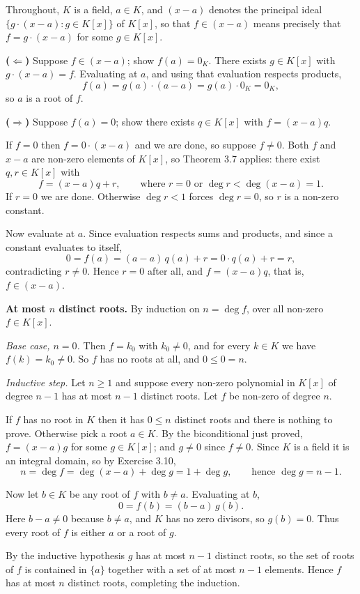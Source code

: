\documentclass[11pt]{article}
\begin{document}
\begin{solution}
  Throughout, $K$ is a field, $a \in K$, and $(x-a)$ denotes the principal ideal
  $\{g \cdot (x-a) : g \in K[x]\}$ of $K[x]$, so that $f \in (x-a)$ means
  precisely that $f = g \cdot (x-a)$ for some $g \in K[x]$.

  \medskip
  \textbf{($\Leftarrow$)} Suppose $f \in (x-a)$; show $f(a) = 0_{K}$. There
  exists $g \in K[x]$ with $g \cdot (x-a) = f$. Evaluating at $a$, and using
  that evaluation respects products,
  \[
    f(a) = g(a) \cdot (a - a) = g(a) \cdot 0_{K} = 0_{K},
  \]
  so $a$ is a root of $f$.

  \medskip
  \textbf{($\Rightarrow$)} Suppose $f(a) = 0$; show there exists $q \in K[x]$
  with $f = (x-a)q$.

  If $f = 0$ then $f = 0 \cdot (x-a)$ and we are done, so suppose $f \neq 0$.
  Both $f$ and $x-a$ are non-zero elements of $K[x]$, so Theorem 3.7 applies:
  there exist $q, r \in K[x]$ with
  \[
    f = (x-a)q + r, \qquad \text{where } r = 0 \text{ or }
    \deg r < \deg (x-a) = 1 .
  \]
  If $r = 0$ we are done. Otherwise $\deg r < 1$ forces $\deg r = 0$, so $r$ is
  a non-zero constant.

  Now evaluate at $a$. Since evaluation respects sums and products, and since a
  constant evaluates to itself,
  \[
    0 = f(a) = (a-a)\,q(a) + r = 0 \cdot q(a) + r = r ,
  \]
  contradicting $r \neq 0$. Hence $r = 0$ after all, and $f = (x-a)q$, that is,
  $f \in (x-a)$.

  \medskip
  \textbf{At most $n$ distinct roots.} By induction on $n = \deg f$, over all
  non-zero $f \in K[x]$.

  \emph{Base case, $n = 0$.} Then $f = k_{0}$ with $k_{0} \neq 0$, and for every
  $k \in K$ we have $f(k) = k_{0} \neq 0$. So $f$ has no roots at all, and
  $0 \leq 0 = n$.

  \emph{Inductive step.} Let $n \geq 1$ and suppose every non-zero polynomial in
  $K[x]$ of degree $n-1$ has at most $n-1$ distinct roots. Let $f$ be non-zero
  of degree $n$.

  If $f$ has no root in $K$ then it has $0 \leq n$ distinct roots and there is
  nothing to prove. Otherwise pick a root $a \in K$. By the biconditional just
  proved, $f = (x-a)g$ for some $g \in K[x]$; and $g \neq 0$ since $f \neq 0$.
  Since $K$ is a field it is an integral domain, so by Exercise 3.10,
  \[
    n = \deg f = \deg (x-a) + \deg g = 1 + \deg g, \qquad
    \text{hence } \deg g = n-1 .
  \]

  Now let $b \in K$ be any root of $f$ with $b \neq a$. Evaluating at $b$,
  \[
    0 = f(b) = (b-a)\,g(b) .
  \]
  Here $b - a \neq 0$ because $b \neq a$, and $K$ has no zero divisors, so
  $g(b) = 0$. Thus every root of $f$ is either $a$ or a root of $g$.

  By the inductive hypothesis $g$ has at most $n-1$ distinct roots, so the set
  of roots of $f$ is contained in $\{a\}$ together with a set of at most $n-1$
  elements. Hence $f$ has at most $n$ distinct roots, completing the induction.
\end{solution}
\end{document}
